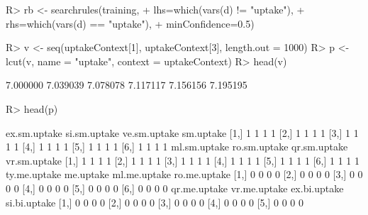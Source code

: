 \documentclass{article}\usepackage[]{graphicx}\usepackage[]{color}
\begin{document}
\begin{Schunk}
% --begin: "pbld4"
\begin{Sinput}
R> rb <- searchrules(training,
+                    lhs=which(vars(d) != "uptake"),
+                    rhs=which(vars(d) == "uptake"),
+                    minConfidence=0.5)
\end{Sinput}
%
% --end: "pbld4"
\end{Schunk}

\begin{Schunk}
% --begin: "pbld5"
\begin{Sinput}
R> v <- seq(uptakeContext[1], uptakeContext[3], length.out = 1000)
R> p <- lcut(v, name = "uptake", context = uptakeContext)
R> head(v)
\end{Sinput}
\begin{Soutput}
[1] 7.000000 7.039039 7.078078 7.117117 7.156156 7.195195
\end{Soutput}
\begin{Sinput}
R> head(p)
\end{Sinput}
\begin{Soutput}
     ex.sm.uptake si.sm.uptake ve.sm.uptake sm.uptake
[1,]            1            1            1         1
[2,]            1            1            1         1
[3,]            1            1            1         1
[4,]            1            1            1         1
[5,]            1            1            1         1
[6,]            1            1            1         1
     ml.sm.uptake ro.sm.uptake qr.sm.uptake vr.sm.uptake
[1,]            1            1            1            1
[2,]            1            1            1            1
[3,]            1            1            1            1
[4,]            1            1            1            1
[5,]            1            1            1            1
[6,]            1            1            1            1
     ty.me.uptake me.uptake ml.me.uptake ro.me.uptake
[1,]            0         0            0            0
[2,]            0         0            0            0
[3,]            0         0            0            0
[4,]            0         0            0            0
[5,]            0         0            0            0
[6,]            0         0            0            0
     qr.me.uptake vr.me.uptake ex.bi.uptake si.bi.uptake
[1,]            0            0            0            0
[2,]            0            0            0            0
[3,]            0            0            0            0
[4,]            0            0            0            0
[5,]            0            0            0            0

\end{Soutput}
\end{Schunk}
\end{document}
